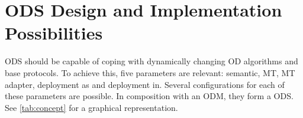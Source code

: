 \section{ODS Design and Implementation Possibilities}
\label{sec:concecptOverview}
ODS should be capable of coping with dynamically changing OD algorithms and base protocols. To achieve this, five parameters are relevant: semantic, MT, MT adapter, deployment as and deployment in. Several configurations for each of these parameters are possible. In composition with an ODM, they form a ODS. See \ref{tab:concept} for a graphical representation.

    
    



